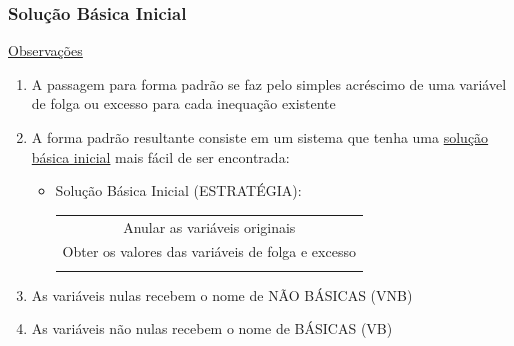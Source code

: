 \begin{frame}
	\frametitle{Solução Básica Inicial}
	\begin{block}{\underline{Observações}}
		\begin{enumerate}
			\item A passagem para forma padrão se faz pelo simples acréscimo de uma variável de folga ou excesso para cada inequação existente \pause
			\item {A forma padrão resultante consiste em um sistema que tenha uma \underline{\color{red}solução básica inicial} mais fácil de ser encontrada:} \pause
			\begin{itemize}
				\item[] {\color{red} Solução Básica Inicial (ESTRATÉGIA):} 
					\begin{table}
						\centering		
						\begin{tabular}{c}
							\scriptsize \cellcolor{yellow!70} Anular as variáveis originais \\
							\scriptsize \cellcolor{yellow!70} Obter os valores das variáveis de folga e excesso \\ \pause
						\end{tabular}
					\end{table}
			\end{itemize}
			\item As {\color{red}variáveis nulas} recebem o nome de {\color{red}NÃO BÁSICAS (VNB)} \\
			\item As {\color{red}variáveis não nulas} recebem o nome de {\color{red}BÁSICAS (VB)} \\
		\end{enumerate}
	\end{block}
\end{frame}

